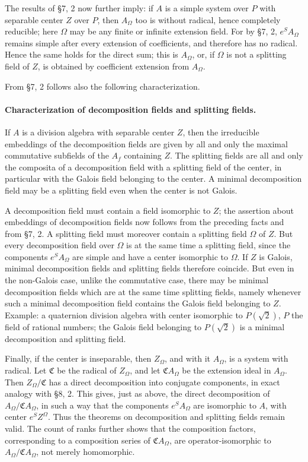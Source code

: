 \documentclass[11pt]{article}
\begin{document}
The results of §7, 2 now further imply: if \(A\) is a simple system over \(P\) with separable center \(Z\) over \(P\), then \(A_\Omega\) too is without radical, hence completely reducible; here \(\Omega\) may be any finite or infinite extension field. For by §7, 2, \(e^S A_\Omega\) remains simple after every extension of coefficients, and therefore has no radical. Hence the same holds for the direct sum; this is \(A_\Omega\), or, if \(\Omega\) is not a splitting field of \(Z\), is obtained by coefficient extension from \(A_\Omega\).

From §7, 2 follows also the following characterization.

\paragraph{Characterization of decomposition fields and splitting fields.}
If \(A\) is a division algebra with separable center \(Z\), then the irreducible embeddings of the decomposition fields are given by all and only the maximal commutative subfields of the \(A_f\) containing \(Z\). The splitting fields are all and only the composita of a decomposition field with a splitting field of the center, in particular with the Galois field belonging to the center. A minimal decomposition field may be a splitting field even when the center is not Galois.

A decomposition field must contain a field isomorphic to \(Z\); the assertion about embeddings of decomposition fields now follows from the preceding facts and from §7, 2. A splitting field must moreover contain a splitting field \(\Omega\) of \(Z\). But every decomposition field over \(\Omega\) is at the same time a splitting field, since the components \(e^S A_\Omega\) are simple and have a center isomorphic to \(\Omega\). If \(Z\) is Galois, minimal decomposition fields and splitting fields therefore coincide. But even in the non-Galois case, unlike the commutative case, there may be minimal decomposition fields which are at the same time splitting fields, namely whenever such a minimal decomposition field contains the Galois field belonging to \(Z\). Example: a quaternion division algebra with center isomorphic to \(P(\sqrt2)\), \(P\) the field of rational numbers; the Galois field belonging to \(P(\sqrt2)\) is a minimal decomposition and splitting field.

Finally, if the center is inseparable, then \(Z_\Omega\), and with it \(A_\Omega\), is a system with radical. Let \(\mathfrak C\) be the radical of \(Z_\Omega\), and let \(\mathfrak C A_\Omega\) be the extension ideal in \(A_\Omega\). Then \(Z_\Omega/\mathfrak C\) has a direct decomposition into conjugate components, in exact analogy with §8, 2. This gives, just as above, the direct decomposition of \(A_\Omega/\mathfrak C A_\Omega\), in such a way that the components \(e^SA_\Omega\) are isomorphic to \(A\), with center \(e^SZ^\Omega\). Thus the theorems on decomposition and splitting fields remain valid. The count of ranks further shows that the composition factors, corresponding to a composition series of \(\mathfrak C A_\Omega\), are operator-isomorphic to \(A_\Omega/\mathfrak C A_\Omega\), not merely homomorphic.
\end{document}
